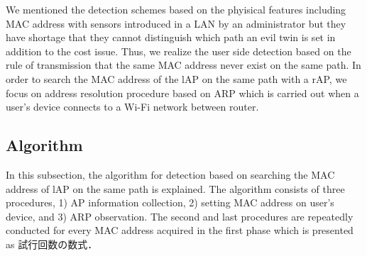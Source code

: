 \documentclass[conference]{IEEEtran}
\begin{document}
We mentioned the detection schemes based on the phyisical features including MAC address with sensors introduced in a LAN by an administrator but they have shortage that they cannot distinguish which path an evil twin is set in addition to the cost issue.
Thus, we realize the user side detection based on the rule of transmission that the same MAC address never exist on the same path.
In order to search the MAC address of the lAP on the same path with a rAP, we focus on address resolution procedure based on ARP which is carried out when a user's device connects to a Wi-Fi network between router.


\subsection{Algorithm}
In this subsection, the algorithm for detection based on searching the MAC address of lAP on the same path is explained.
The algorithm consists of three procedures, 1) AP information collection, 2) setting MAC address on user's device, and 3) ARP observation.
The second and last procedures are repeatedly conducted for every MAC address acquired in the first phase which is presented as 試行回数の数式．
\end{document}
